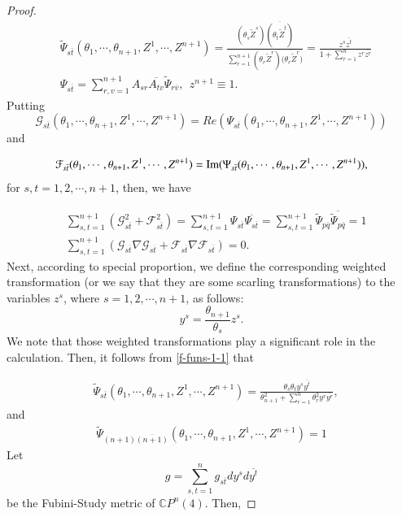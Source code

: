 \documentclass[12pt]{article}
\numberwithin{equation}{section}
\begin{document}
\begin{proof}
\begin{equation}\begin{aligned}\label{f-funs-1-1}&\widetilde{\Psi}_{s\overline{t}}(\theta_{1},\cdots,\theta_{n+1},Z^{1},\cdots,Z^{n+1})
=\frac{(\theta_{s}\widetilde{Z}^{s})\overline{(\theta_{t}\widetilde{Z}^{t})}}
{\sum^{n+1}_{r=1}(\theta_{r}\widetilde{Z}^{r})\overline{(\theta_{r}\widetilde{Z}^{r}})}
=\frac{z^{s}\overline{z^{t}}}{1+\sum^{n}_{r=1}z^{r}\overline{z^{r}}}\\
&\Psi_{s\overline{t}}=\sum^{n+1}_{r,v=1}A_{sr}\overline{A_{tv}}\widetilde{\Psi}_{r\overline{v}},\ \ z^{n+1}\equiv1.\end{aligned}\end{equation}
Putting $$\mathcal{G}_{s\overline{t}}(\theta_{1},\cdots,\theta_{n+1},Z^{1},\cdots,Z^{n+1})=
Re(\Psi_{s\overline{t}}(\theta_{1},\cdots,\theta_{n+1},Z^{1},\cdots,Z^{n+1}))$$ and

$$\mathcal{F}_{s\overline{t}}(\theta_{1},\cdots,\theta_{n+1},Z^{1},\cdots,Z^{n+1})={\rm Im}(\Psi_{s\overline{t}}(\theta_{1},\cdots,\theta_{n+1},Z^{1},\cdots,Z^{n+1})),$$
for $s,t=1,2,\cdots,n+1$, then, we have

\begin{equation}\begin{aligned}\label{G-F=1-1}&\sum^{n+1}_{s,t=1}\left(\mathcal{G}^{2}_{s\overline{t}}+\mathcal{F}^{2}_{s\overline{t}}\right)
=\sum^{n+1}_{s,t=1}\Psi_{s\overline{t}}\overline{\Psi_{s\overline{t}}}
=\sum^{n+1}_{s,t=1}\widetilde{\Psi}_{p\overline{q}}\overline{\widetilde{\Psi}_{p\overline{q}}}=1\\
&\sum^{n+1}_{s,t=1}\left(\mathcal{G}_{s\overline{t}}\nabla \mathcal{G}_{s\overline{t}}+\mathcal{F}_{s\overline{t}}\nabla \mathcal{F}_{s\overline{t}}\right)=0.\end{aligned}\end{equation}
Next, according to special proportion, we define the corresponding weighted transformation (or we say that they are some scarling transformations) to the variables $z^{s}$, where $s=1,2,\cdots,n+1$, as follows: $$y^{s}=\frac{\theta_{n+1}}{\theta_{s}}z^{s}.$$
We note that those weighted transformations play a significant role in the calculation. Then, it follows from \eqref{f-funs-1-1} that




\begin{equation}\begin{aligned}\label{f-funs-12}&\widetilde{\Psi}_{s\overline{t}}(\theta_{1},\cdots,\theta_{n+1},Z^{1},\cdots,Z^{n+1})
=\frac{\theta_{s}\theta_{t}y^{s}\overline{y^{t}}}{\theta^{2}_{n+1}+\sum^{n}_{r=1}\theta^{2}_{r}y^{r}\overline{y^{r}}},\end{aligned}\end{equation}and
\begin{equation}\begin{aligned}\label{f-funs-2-n+1}\widetilde{\Psi}_{(n+1)\overline{(n+1)}}(\theta_{1},\cdots,\theta_{n+1},Z^{1},\cdots,Z^{n+1})
=1\end{aligned}\end{equation}
Let
$$g=\sum^{n}_{s,t=1} g_{s\overline{t}}dy^{s}d\overline{y^{t}}$$
be the Fubini-Study metric of $\mathbb{C}P^{n}(4)$. Then,




\end{proof}
\end{document}
